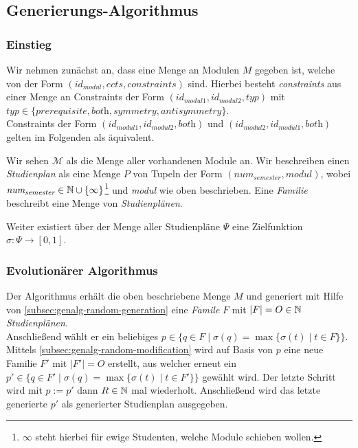 \subsection{Generierungs-Algorithmus}

\newcommand{\id}[1]{\textit{id}_{#1}}
\newenvironment{nstabbing}{
	\setlength{\topsep}{-\parskip}%
	\setlength{\partopsep}{0pt}%
	\tabbing
}{\endtabbing}

\subsubsection{Einstieg}
Wir nehmen zunächst an, dass eine Menge an Modulen $M$ gegeben ist, welche von der Form $(\id{\textit{modul}}, \textit{ects}, \textit{constraints})$ sind.
Hierbei besteht \textit{constraints} aus einer Menge an Constraints der Form $(\id{\textit{modul1}}, \id{\textit{modul2}}, \textit{typ})$ mit $\textit{typ} \in \{\textit{prerequisite}, \textit{both}, \textit{symmetry}, \textit{antisymmetry}\}$. \\
Constraints der Form $(\id{\textit{modul1}}, \id{\textit{modul2}}, \textit{both})$ und $(\id{\textit{modul2}}, \id{\textit{modul1}}, \textit{both})$ gelten im Folgenden als äquivalent.

Wir sehen $ \mathcal{M} $ als die Menge aller vorhandenen Module an.
Wir beschreiben einen \textit{Studienplan} als eine Menge $P$ von Tupeln der Form $(\textit{num}_{\textit{semester}}, \textit{modul})$, wobei $\textit{num}_{\textit{semester}} \in \mathbb{N} \cup \{\infty\}$\footnote{$\infty$ steht hierbei für ewige Studenten, welche Module schieben wollen.} und \textit{modul} wie oben beschrieben. Eine \textit{Familie} beschreibt eine Menge von \textit{Studienplänen}. 

Weiter existiert über der Menge aller Studienpläne $\Psi$ eine Zielfunktion  $\sigma : \Psi \to [0,1]$.

\subsubsection{Evolutionärer Algorithmus}
Der Algorithmus erhält die oben beschriebene Menge $M$ und generiert mit Hilfe von  \ref{subsec:genalg-random-generation} eine \textit{Famile} $F$ mit $|F| = O \in \mathbb{N}$ \textit{Studienplänen}.\\
Anschließend wählt er ein beliebiges $p \in \{q \in F \mid \sigma(q)=\max \{\sigma(t) \mid t \in F \} \}$.\\
Mittels \ref{subsec:genalg-random-modification} wird auf Basis von $p$ eine neue Familie $F'$ mit $|F'| = O$ erstellt, aus welcher erneut ein $p' \in \{q \in F' \mid \sigma(q) = \max \{\sigma(t) \mid t \in F' \} \}$ gewählt wird. Der letzte Schritt wird mit $p := p'$ dann $R \in \mathbb{N}$ mal wiederholt.
Anschließend wird das letzte generierte $p'$ als generierter Studienplan ausgegeben.

